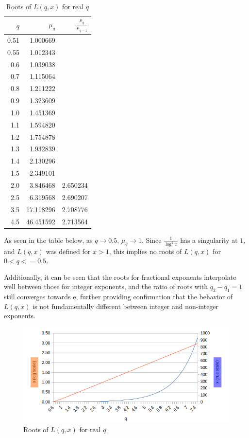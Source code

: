 \documentclass[a4paper,11pt,twoside]{amsart}
\newcommand\e{\mathrm{e}}
\begin{document}
\begin{table}[H]
    \begin{tabular}{r|r|r} %
      $q$ & $\mu_{q}$ & $\frac{\mu_{q}}{\mu_{q-1}}$\\
      \hline
      0.51 & 1.000669 & \\
      0.55 & 1.012343 & \\
      0.6 & 1.039038 & \\
      0.7 & 1.115064 & \\
      0.8 & 1.211222 & \\
      0.9 & 1.323609 & \\
      1.0 & 1.451369 & \\
      1.1 & 1.594820 & \\
      1.2 & 1.754878 & \\
      1.3 & 1.932839 & \\
      1.4 & 2.130296 & \\
      1.5 & 2.349101 & \\
      2.0 & 3.846468 & 2.650234\\
      2.5 & 6.319568 & 2.690207\\
      3.5 & 17.118296 & 2.708776\\
      4.5 & 46.451592 & 2.713564\\
    \end{tabular}
    \caption{Roots of $L(q,x)$ for real $q$}
\end{table}
\vspace{-2em}
As seen in the table below, as $q \to 0.5$, $\mu_{q} \to 1$. Since $\frac{1}{\log^{q} x}$ has a singularity at $1$, and $L(q,x)$ was defined for $x>1$, this implies no roots of $L(q,x)$ for $0<q<=0.5$.

Additionally, it can be seen that the roots for fractional exponents interpolate well between those for integer exponents, and the ratio of roots with $q_2 - q_1 = 1$ still converges towards $\e$, further providing confirmation that the behavior of $L(q,x)$ is not fundamentally different between integer and non-integer exponents.

\begin{figure}[H]
  \includegraphics[width=0.5\linewidth]{logpowrealroots.png}
  \caption{Roots of $L(q,x)$ for real $q$}
\end{figure}
\end{document}
